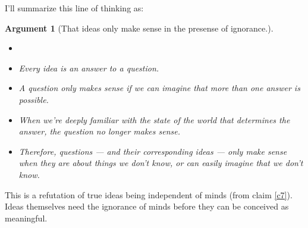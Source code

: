 \documentclass[11pt, oneside]{article}   	%
\newtheorem{argt}{Argument}
\begin{document}
I'll summarize this line of thinking as:
\begin{argt}[That ideas only make sense in the presense of ignorance.]
    \label{a3}
    \normalfont
    \begin{itemize}
        \item[]
        \item Every idea is an answer to a question.
        \item A question only makes sense if we can imagine that more than one
            answer is possible.
        \item When we're deeply familiar with the state of the world that
            determines the answer, the question no longer makes sense.
        \item Therefore, questions --- and their corresponding ideas --- only
            make sense when they are about things we don't know, or can easily
            imagine that we don't know.
    \end{itemize}
\end{argt}
This is a refutation of true ideas being independent of minds (from
claim \ref{c7}). Ideas themselves need the ignorance of minds before they can be
conceived as meaningful.

\end{document}
